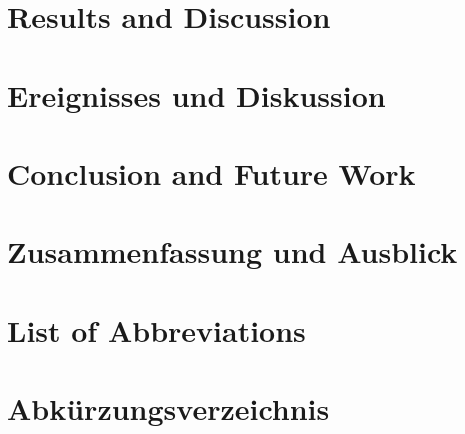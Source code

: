 \documentclass[oneside,11pt,a4paper,twoside]{scrreprt}
\begin{document}
\begin{onehalfspace}
	{\chapter{Results and Discussion}}
	{\chapter{Ereignisses und Diskussion}}
\label{cha:results_and_discussion}

\cleardoublepage

	{\chapter{Conclusion and Future Work}}
	{\chapter{Zusammenfassung und Ausblick}}
\label{cha:conclusion_and_future_work}

\cleardoublepage

\end{onehalfspace}
	{\printbibliography[title={References},heading=bibintoc]}
	{\printbibliography[title={Referenzen},heading=bibintoc]}
\cleardoublepage
{
	\chapter*{List of Abbreviations}
}
{
	\chapter*{Abkürzungsverzeichnis}
}
\end{document}
